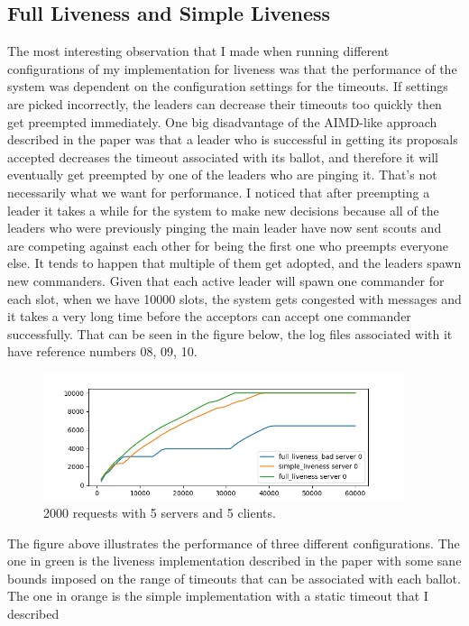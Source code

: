 \documentclass[11pt]{article}
\begin{document}
\subsection*{Full Liveness and Simple Liveness}
The most interesting observation that I made when running different configurations
of my implementation for liveness was that the performance of the system was
dependent on the configuration settings for the timeouts. If settings are picked incorrectly,
the leaders can decrease their timeouts too quickly then get preempted immediately.
One big disadvantage of the AIMD-like approach described in the paper was that
a leader who is successful in getting its proposals accepted decreases the timeout
associated with its ballot, and therefore it will eventually get preempted by one
of the leaders who are pinging it. That's not necessarily what we want for performance. I noticed that after preempting a leader it takes a while for the system to make
new decisions because all of the leaders who were previously pinging the main leader have now
sent scouts and are competing against each other for being the first one who preempts
everyone else. It tends to happen that multiple of them get adopted, and the leaders spawn
new commanders. Given that each active leader will spawn one commander for each slot,
when we have 10000 slots, the system gets congested with messages and it takes
a very long time before the acceptors can accept one commander successfully.
That can be seen in the figure below, the log files associated with it have
reference numbers 08, 09, 10.
\begin{figure}[H]
    \centering
    \includegraphics[width=400px]{liveness_simple_bad_config.png}
    \caption{2000 requests with 5 servers and 5 clients.}
    \vspace{-15pt}
\end{figure}
The figure above illustrates the performance of three different configurations.
The one in green is the liveness implementation described in the paper with some
sane bounds imposed on the range of timeouts that can be associated with each ballot.
The one in orange is the simple implementation with a static timeout that I described
\end{document}
